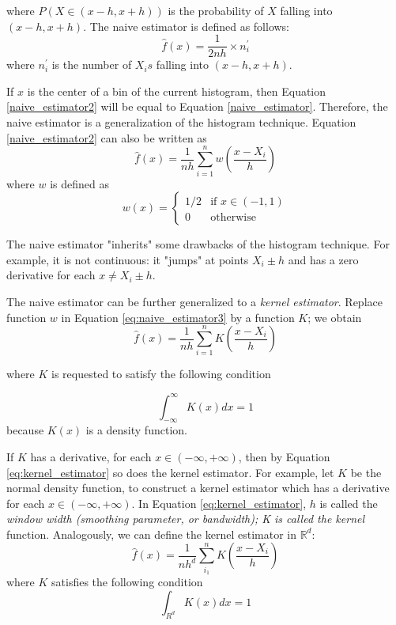 where $P(X \in (x-h,x+h))$ is the probability of $X$ falling into $(x-h,x+h)$.
The naive estimator is defined as follows:
\begin{equation}\label{eq:naive_estimator2}
	\hat{f}(x) = \frac{1}{2nh} \times n_i^{\prime}
\end{equation}
where $n_i^{\prime}$ is the number of $X_i s$ falling into $(x-h,x+h)$. 

If $x$ is the center of a bin of the current histogram, then Equation 
\eqref{naive_estimator2} will be equal to Equation \eqref{naive_estimator}. 
Therefore, the naive estimator is a generalization of the histogram technique.
Equation \eqref{naive_estimator2} can also be written as
\begin{equation}\label{eq:naive_estimator3}
	\hat{f}(x) = \frac{1}{nh}\sum_{i=1}^n w\left( \frac{x - X_i}{h} \right)
\end{equation}
where $w$ is defined as 
\begin{equation}\label{naive_estimator3}
	w(x) = \begin{cases}
				1/2 & \text{if } x \in (-1,1) \\
				0 & \text{otherwise }
		\end{cases}
\end{equation}

The naive estimator "inherits" some drawbacks of the histogram technique.
For example, it is not continuous: it "jumps" at points $X_i \pm h$ and has a 
zero derivative for each $x \neq X_i \pm h$.

The naive estimator can be further generalized to a \emph{kernel estimator}. 
Replace function $w$ in Equation \eqref{eq:naive_estimator3} by a function $K$;
we obtain
\begin{equation}\label{eq:kernel_estimator}
	\hat{f}(x) = \frac{1}{nh} \sum_{i=1}^n K\left( \frac{x - X_i}{h} \right)
\end{equation}

where $K$ is requested to satisfy the following condition

\begin{equation}\label{eq:kernel_condition}
	\int_{-\infty}^{\infty} K(x)dx = 1
\end{equation}
because $K(x)$ is a density function.

If $K$ has a derivative, for each $x \in (-\infty, +\infty)$, then by Equation
\eqref{eq:kernel_estimator} so does the kernel estimator. For example, let $K$
be the normal density function, to construct a kernel estimator which has a 
derivative for each $x \in (-\infty, +\infty)$. In Equation \eqref{eq:kernel_estimator}, $h$ is called the \emph{window width (smoothing parameter, or bandwidth); K is called the kernel} function. 
Analogously, we can define the kernel estimator in $\mathbb{R}^d$:
\begin{equation}\label{eq:kernel_estimator_rd}
	\hat{f}(x) = \frac{1}{nh^d} \sum_{i_1}^n K\left( \frac{x-X_i}{h} \right)
\end{equation} 
where $K$ satisfies the following condition
\begin{equation}\label{eq:kernel_rd_condition}
	\int_{R^d} K(x)dx = 1
\end{equation}

